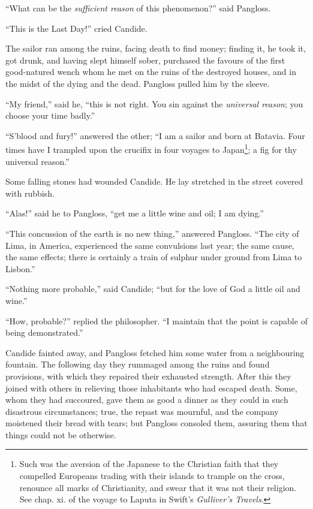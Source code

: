 ``What can be the \textit{sufficient reason} of this phenomenon?'' said Pangloss.

``This is the Last Day!'' cried Candide.

The sailor ran among the ruins, facing death to find money; finding it, he took it, got drunk, and having slept himself sober, purchased the favours of the first good-natured wench whom he met on the ruins of the destroyed houses, and in the midst of the dying and the dead. Pangloss pulled him by the sleeve.

``My friend,'' said he, ``this is not right. You sin against the \textit{universal reason}; you choose your time badly.''

``S'blood and fury!'' answered the other; ``I am a sailor and born at Batavia. Four times have I trampled upon the crucifix in four voyages to Japan\footnote{Such was the aversion of the Japanese to the Christian faith that they compelled Europeans trading with their islands to trample on the cross, renounce all marks of Christianity, and swear that it was not their religion. See chap. xi. of the voyage to Laputa in Swift's \textit{Gulliver's Travels}.}; a fig for thy universal reason.''

Some falling stones had wounded Candide. He lay stretched in the street covered with rubbish.

``Alas!'' said he to Pangloss, ``get me a little wine and oil; I am dying.''

``This concussion of the earth is no new thing,'' answered Pangloss. ``The city of Lima, in America, experienced the same convulsions last year; the same cause, the same effects; there is certainly a train of sulphur under ground from Lima to Lisbon.''

``Nothing more probable,'' said Candide; ``but for the love of God a little oil and wine.''

``How, probable?'' replied the philosopher. ``I maintain that the point is capable of being demonstrated.''

Candide fainted away, and Pangloss fetched him some water from a neighbouring fountain. The following day they rummaged among the ruins and found provisions, with which they repaired their exhausted strength. After this they joined with others in relieving those inhabitants who had escaped death. Some, whom they had succoured, gave them as good a dinner as they could in such disastrous circumstances; true, the repast was mournful, and the company moistened their bread with tears; but Pangloss consoled them, assuring them that things could not be otherwise.

